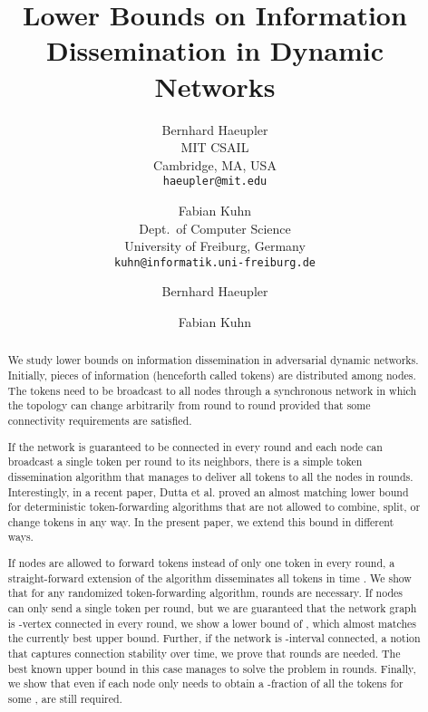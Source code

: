 \documentclass{llncs}
\author{Bernhard Haeupler\\MIT CSAIL\\Cambridge, MA, USA\\
\texttt{haeupler@mit.edu}\and Fabian Kuhn\\ Dept.\ of Computer Science\\
University of Freiburg, Germany
\\\texttt{kuhn@informatik.uni-freiburg.de}}
\date{}
\begin{document}
\title{Lower Bounds on Information Dissemination in Dynamic Networks}
\author{Bernhard Haeupler \and Fabian Kuhn}
\date{}

\maketitle

\begin{abstract}
    We study lower bounds on information dissemination in adversarial
    dynamic networks.
Initially,  pieces of information (henceforth called tokens)
    are distributed among  nodes. The tokens need to be broadcast
    to all nodes through a synchronous network in which the topology
    can change arbitrarily from round to round provided that some
    connectivity requirements are satisfied.

    If the network is guaranteed to be connected in every round and
    each node can broadcast a single token per round to its neighbors,
    there is a simple token dissemination algorithm that manages to
    deliver all  tokens to all the nodes in 
    rounds. Interestingly, in a recent paper, Dutta et al. proved an
    almost matching  lower bound for
    deterministic token-forwarding algorithms that are not allowed to
    combine, split, or change tokens in any way. In the present paper,
    we extend this bound in different ways.

    If nodes are allowed to forward  tokens instead of only
    one token in every round, a straight-forward extension of the
     algorithm disseminates all  tokens in time
    . We show that for any randomized token-forwarding
    algorithm,  rounds are
    necessary. If nodes can only send a single token per round, but we
    are guaranteed that the network graph is -vertex connected in
    every round, we show a lower bound of , which
    almost matches the currently best  upper bound. Further,
    if the network is -interval connected, a notion that captures
    connection stability over time, we prove that  rounds are needed. The best known upper bound in
    this case manages to solve the problem in 
    rounds. Finally, we show that even if each node only needs to
    obtain a -fraction of all the tokens for some ,  are still required.
\end{abstract}
\end{document}
